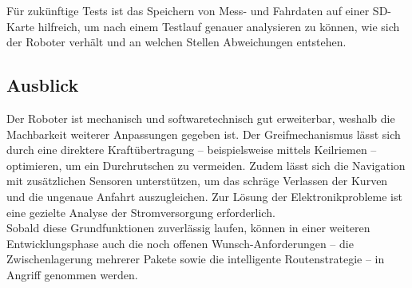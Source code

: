 \documentclass[11pt,a4paper]{article}
\begin{document}
	\noindent
	Für zukünftige Tests ist das Speichern von Mess- und Fahrdaten auf einer SD-Karte hilfreich, um nach einem Testlauf genauer analysieren zu können, wie sich der Roboter verhält und an welchen Stellen Abweichungen entstehen.
	
	\subsection{Ausblick}
	
	Der Roboter ist mechanisch und softwaretechnisch gut erweiterbar, weshalb die Machbarkeit weiterer Anpassungen gegeben ist. Der Greifmechanismus lässt sich durch eine direktere Kraftübertragung -- beispielsweise mittels Keilriemen -- optimieren, um ein Durchrutschen zu vermeiden. Zudem lässt sich die Navigation mit zusätzlichen Sensoren unterstützen, um das schräge Verlassen der Kurven und die ungenaue Anfahrt auszugleichen. Zur Lösung der Elektronikprobleme ist eine gezielte Analyse der Stromversorgung erforderlich.\\
	
	\noindent
	Sobald diese Grundfunktionen zuverlässig laufen, können in einer weiteren Entwicklungsphase auch die noch offenen Wunsch-Anforderungen -- die Zwischenlagerung mehrerer Pakete sowie die intelligente Routenstrategie -- in Angriff genommen werden.
	
	
	\newpage
	\printbibliography[
	heading=bibnumbered,
	title={Literaturverzeichnis}
	]
	
	\newpage
	\listoffigures
	
	\newpage
	\listoftables
	
\end{document}
